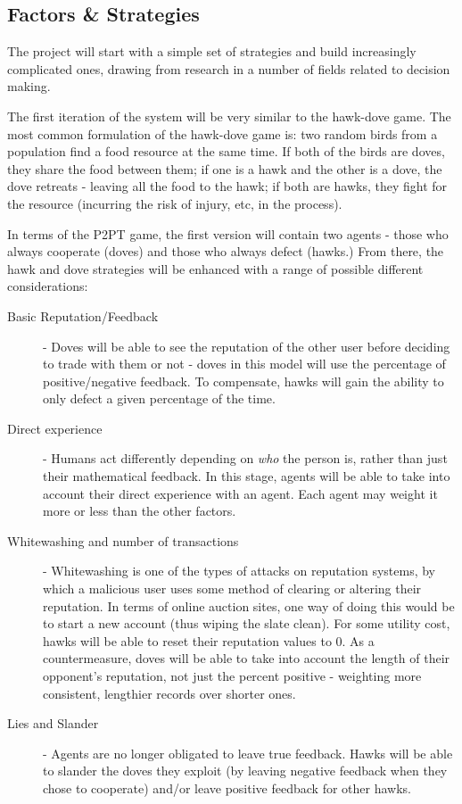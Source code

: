 \documentclass{article}
\begin{document}
\subsection{Factors \& Strategies}
\label{sec:factors-strategies}
The project will start with a simple set of strategies and build increasingly complicated ones, drawing from research in a number of fields related to decision making.

The first iteration of the system will be very similar to the hawk-dove game\cite{smith1973lhe}. The most common formulation of the hawk-dove game is: two random birds from a population find a food resource at the same time. If both of the birds are doves, they share the food between them; if one is a hawk and the other is a dove, the dove retreats - leaving all the food to the hawk; if both are hawks, they fight for the resource (incurring the risk of injury, etc, in the process).

In terms of the P2PT game, the first version will contain two agents - those who always cooperate (doves) and those who always defect (hawks.) From there, the hawk and dove strategies will be enhanced with a range of possible different considerations:
\begin{description}
	\item[Basic Reputation/Feedback] - Doves will be able to see the reputation of the other user before deciding to trade with them or not - doves in this model will use the percentage of positive/negative feedback. To compensate, hawks will gain the ability to only defect a given percentage of the time.
	\item[Direct experience] - Humans act differently depending on \emph{who} the person is\cite{fehr2003nature}, rather than just their mathematical feedback. In this stage, agents will be able to take into account their direct experience with an agent. Each agent may weight it more or less than the other factors.
	\item[Whitewashing and number of transactions] - Whitewashing\cite{hoffman2009survey} is one of the types of attacks on reputation systems, by which a malicious user uses some method of clearing or altering their reputation. In terms of online auction sites, one way of doing this would be to start a new account (thus wiping the slate clean). For some utility cost, hawks will be able to reset their reputation values to 0. As a countermeasure, doves will be able to take into account the length of their opponent's reputation, not just the percent positive - weighting more consistent, lengthier records over shorter ones.
	\item[Lies and Slander] - Agents are no longer obligated to leave true feedback. Hawks will be able to slander\cite{hoffman2009survey} the doves they exploit (by leaving negative feedback when they chose to cooperate) and/or leave positive feedback for other hawks.
\end{description}
\end{document}
